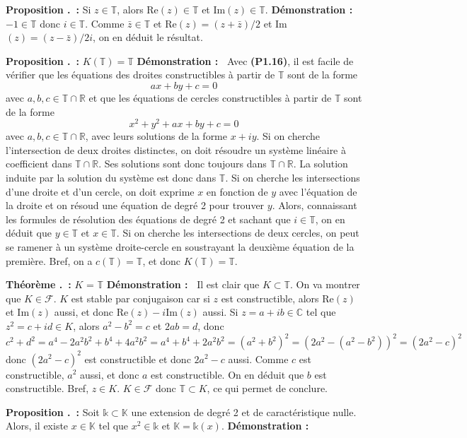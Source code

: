 \documentclass[5pt,a4paper]{article}
\newcounter{prop}[section]
\newcounter{thm}[section]
\renewcommand{\theprop}{\thesection.\arabic{prop}}
\renewcommand{\thethm}{\thesection.\arabic{thm}}
\newcommand{\prop}[1]{\stepcounter{prop}\noindent\textbf{Proposition \theprop ~:} #1 \newline}
\newcommand{\thm}[1]{\stepcounter{thm}\noindent\textbf{Théorème \thethm ~:} #1 \newline}
\newcommand{\demo}[1]{\textbf{Démonstration :~} #1 \newline}
\begin{document}
\begin{onehalfspacing}
\prop{Si $z \in \mathbb{T}$, alors Re$(z) \in \mathbb{T}$ et Im$(z) \in \mathbb{T}$.}
\demo{$-1 \in \mathbb{T}$ donc $i \in \mathbb{T}$. Comme $\bar{z} \in \mathbb{T}$ et Re$(z) = (z + \bar{z})/2$ et Im$(z) = (z - \bar{z})/2i$, on en déduit le résultat.}

\prop{$K(\mathbb{T}) = \mathbb{T}$}
\demo{Avec \textbf{(P1.16)}, il est facile de vérifier que les équations des droites constructibles à partir de $\mathbb{T}$ sont de la forme 
    \[ax + by + c = 0\]
avec $a,b,c \in \mathbb{T}\cap\mathbb{R}$ et que les équations de cercles constructibles à partir de $\mathbb{T}$ sont de la forme 
    \[x^2 + y^2 + ax +  by + c = 0\]
avec $a,b,c \in \mathbb{T}\cap\mathbb{R}$, avec leurs solutions de la forme $x + iy$. Si on cherche l'intersection de deux droites distinctes, on doit résoudre un système linéaire à coefficient dans $\mathbb{T}\cap\mathbb{R}$. Ses solutions sont donc toujours dans $\mathbb{T}\cap\mathbb{R}$. La solution induite par la solution du système est donc dans $\mathbb{T}$. Si on cherche les intersections d'une droite et d'un cercle, on doit exprime $x$ en fonction de $y$ avec l'équation de la droite et on résoud une équation de degré 2 pour trouver $y$. Alors, connaissant les formules de résolution des équations de degré 2 et sachant que $i \in \mathbb{T}$, on en déduit que $y \in \mathbb{T}$ et $x \in \mathbb{T}$. Si on cherche les intersections de deux cercles, on peut se ramener à un système droite-cercle en soustrayant la deuxième équation de la première. Bref, on a $c(\mathbb{T}) = \mathbb{T}$, et donc $K(\mathbb{T}) = \mathbb{T}$.}

\thm{$K$ = $\mathbb{T}$}
\demo{Il est clair que $K \subset \mathbb{T}$. On va montrer que $K \in \mathcal{F}$. $K$ est stable par conjugaison car si $z$ est constructible, alors Re$(z)$ et Im$(z)$ aussi, et donc Re$(z) - i$Im$(z)$ aussi. Si $z = a+ib \in \mathbb{C}$ tel que $z^2 = c + id \in K$, alors $a^2 - b^2 = c$ et $2ab = d$, donc 
\[c^2 + d^2 = a^4 - 2a^2b^2 + b^4 + 4a^2b^2 = a^4 + b^4 + 2a^2b^2 = (a^2 + b^2)^2 = (2a^2 -(a^2 - b^2))^2 = (2a^2 - c)^2\]
donc $(2a^2 - c)^2$ est constructible et donc $2a^2 - c$ aussi. Comme $c$ est constructible, $a^2$ aussi, et donc $a$ est constructible. On en déduit que $b$ est constructible. Bref, $z \in K$. $K \in \mathcal{F}$ donc $\mathbb{T} \subset K$, ce qui permet de conclure.}

\prop{Soit $\mathds{k} \subset \mathbb{K}$ une extension de degré 2 et de caractéristique nulle. Alors, il existe $x \in \mathbb{K}$ tel que $x^2 \in \mathds{k}$ et $\mathbb{K} = \mathds{k}(x)$.}
\demo{}


\end{onehalfspacing}
\end{document}
